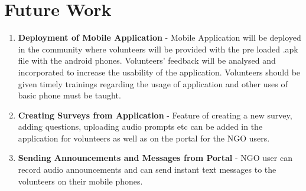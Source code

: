 \section{Future Work}

\begin{enumerate}
\item \textbf{Deployment of Mobile Application} - Mobile Application will be deployed in the community where volunteers will be provided with the pre loaded .apk file with the android phones. Volunteers’ feedback will be analysed and incorporated to increase the usability of the application. Volunteers should be given timely trainings regarding the usage of application and other uses  of basic phone must be taught.
\item \textbf{Creating Surveys from Application} - Feature of creating a new survey, adding questions, uploading audio prompts etc  can be added in the application for volunteers as well as on the portal for the NGO users.
\item \textbf{Sending Announcements and Messages from Portal} - NGO user can record audio announcements and can send instant text messages to the volunteers on their mobile phones. 
\end{enumerate}





